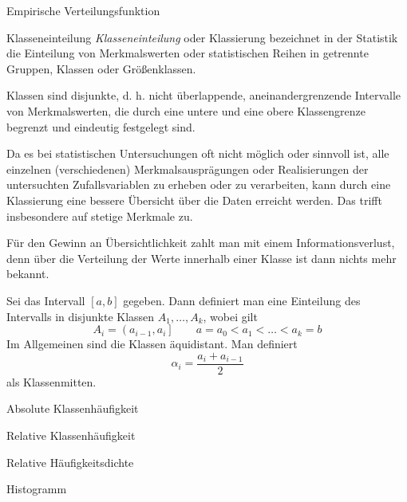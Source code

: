 \begin{example}{Empirische Verteilungsfunktion}

\end{example}

\begin{defi}{Klasseneinteilung}
    \emph{Klasseneinteilung} oder Klassierung bezeichnet in der Statistik die Einteilung von Merkmalswerten oder statistischen Reihen in getrennte Gruppen, Klassen oder Größenklassen. 

    Klassen sind disjunkte, d. h. nicht überlappende, aneinandergrenzende Intervalle von Merkmalswerten, die durch eine untere und eine obere Klassengrenze begrenzt und eindeutig festgelegt sind.

    Da es bei statistischen Untersuchungen oft nicht möglich oder sinnvoll ist, alle einzelnen (verschiedenen) Merkmalsausprägungen oder Realisierungen der untersuchten Zufallsvariablen zu erheben oder zu verarbeiten, kann durch eine Klassierung eine bessere Übersicht über die Daten erreicht werden. 
    Das trifft insbesondere auf stetige Merkmale zu. 

    Für den Gewinn an Übersichtlichkeit zahlt man mit einem Informationsverlust, denn über die Verteilung der Werte innerhalb einer Klasse ist dann nichts mehr bekannt. 

    Sei das Intervall $[a,b]$ gegeben.
    Dann definiert man eine Einteilung des Intervalls in disjunkte Klassen $A_1, \ldots, A_k$, wobei gilt
    \[ 
        A_i = \left( a_{i-1}, a_i \right] \qquad a = a_0 < a_1 < \ldots < a_k = b
    \]
    Im Allgemeinen sind die Klassen äquidistant. 
    Man definiert
    \[ 
        \alpha_i = \frac{a_i + a_{i-1}}{2}
    \] 
    als Klassenmitten.
\end{defi}

\begin{defi}{Absolute Klassenhäufigkeit}

\end{defi}

\begin{defi}{Relative Klassenhäufigkeit}

\end{defi}

\begin{defi}{Relative Häufigkeitsdichte}

\end{defi}

\begin{defi}{Histogramm}

\end{defi}


